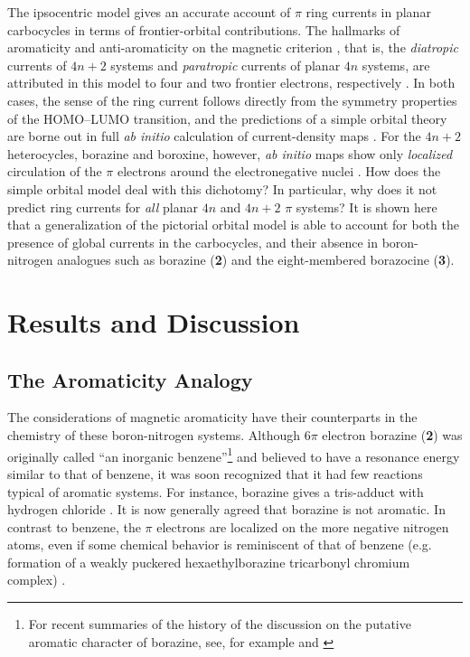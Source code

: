 The ipsocentric model \cite{r03,r04,r05} gives an accurate account of $\pi$ ring currents in planar carbocycles in terms of frontier-orbital contributions. The hallmarks of aromaticity and anti-aromaticity on the magnetic criterion \cite{r06,r07,r08,r09}, that is, the \textit{diatropic} currents of $4n+2$ systems and \textit{paratropic} currents \cite{r10} of planar $4n$ systems, are attributed in this model to four and two frontier electrons, respectively \cite{r04}. In both cases, the sense of the ring current follows directly from the symmetry properties of the HOMO--LUMO transition, and the predictions of a simple orbital theory are borne out in full \textit{ab initio} calculation of current-density maps \cite{r03,r04}. For the $4n+2$ heterocycles, borazine and boroxine, however, \textit{ab initio} maps show only \textit{localized} circulation of the $\pi$ electrons around the electronegative nuclei \cite{r02}.  How does the simple orbital model deal with this dichotomy?  In particular, why does it not predict ring currents for \textit{all} planar $4n$ and $4n+2$ $\pi$ systems? It is shown here that a generalization of the pictorial orbital model is able to account for both the presence of global currents in the carbocycles, and their absence in boron-nitrogen analogues such as borazine (\textbf{2}) and the eight-membered borazocine (\textbf{3}).

\section{Results and Discussion}

\subsection{The Aromaticity Analogy}

The considerations of magnetic aromaticity have their counterparts in the chemistry of these boron-nitrogen systems.  Although 6$\pi$ electron borazine (\textbf{2}) was originally called ``an inorganic benzene''\footnote{For recent summaries of the history of the discussion on the putative aromatic character of borazine, see, for example \cite{r11} and \cite{r11b}} and believed to have a resonance
energy similar to that of benzene, it was soon recognized that it had few reactions typical of aromatic systems.  For instance, borazine gives a tris-adduct with hydrogen chloride \cite{r12}. It is now generally agreed that borazine is not aromatic. In contrast to benzene, the $\pi$ electrons are localized on the more negative nitrogen atoms, even if some chemical behavior is reminiscent of that of benzene (e.g. formation of a weakly puckered hexaethylborazine tricarbonyl chromium complex) \cite{r13}.

